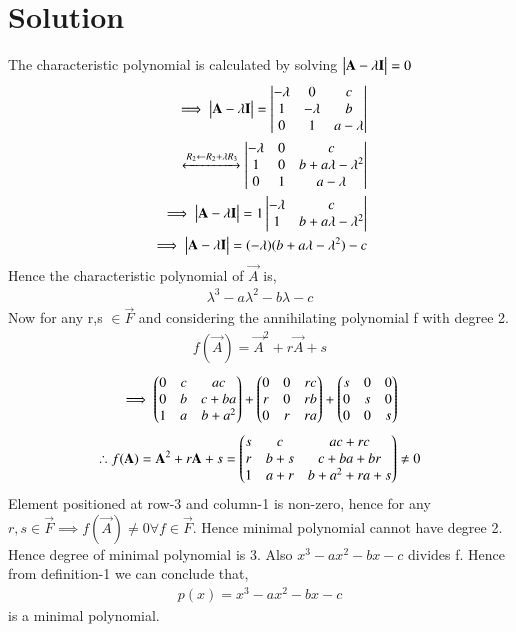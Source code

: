 \documentclass[journal,12pt,twocolumn]{IEEEtran}
\begin{document}
\section{Solution}
The characteristic polynomial is calculated by solving $\begin{vmatrix}\mathbf{A}-\lambda \mathbf{I}\end{vmatrix} = 0$
\begin{align}
\implies \begin{vmatrix}\mathbf{A}-\lambda \mathbf{I}\end{vmatrix} = \begin{vmatrix}-\lambda &0&c\\1&-\lambda &b\\0&1&a-\lambda\end{vmatrix}\\
\xleftrightarrow[]{R_2\leftarrow R_2+\lambda R_3} \begin{vmatrix}-\lambda &0&c\\1&0&b+a\lambda-\lambda^2\\0&1&a-\lambda\end{vmatrix}\\
\implies \begin{vmatrix}\mathbf{A}-\lambda \mathbf{I}\end{vmatrix} = 1\begin{vmatrix}-\lambda & c \\1 & b+a\lambda-\lambda^2\end{vmatrix}\\
\implies \begin{vmatrix}\mathbf{A}-\lambda \mathbf{I}\end{vmatrix} = (-\lambda)( b+a\lambda-\lambda^2) - c
\end{align}
Hence the characteristic polynomial of $\vec{A}$ is,
\begin{align}
\lambda^3-a\lambda^2-b\lambda-c
\label{cp}
\end{align}
Now for any r,s $\in \vec{F}$ and considering the annihilating polynomial f with degree 2.
\begin{align}
f(\vec{A}) = \vec{A}^2+r\vec{A}+s
\end{align}
\begin{align}
\implies \begin{pmatrix}0&c&ac\\0&b&c+ba\\1&a&b+a^2\end{pmatrix} + \begin{pmatrix}0&0&rc\\r&0&rb\\0&r&ra\end{pmatrix}+ \begin{pmatrix}s&0&0\\0&s&0\\0&0&s\end{pmatrix}
\end{align}
\begin{align}
\therefore f(\mathbf{A}) = \mathbf{A}^2+r\mathbf{A}+s = \begin{pmatrix}s&c&ac+rc\\r&b+s&c+ba+br\\1&a+r&b+a^2+ra+s\end{pmatrix} \neq 0
\label{fa}
\end{align}
Element positioned at row-3 and column-1 is non-zero, hence for any $r,s \in \vec{F} \implies f(\vec{A})\neq 0  \forall f \in \vec{F}$. Hence minimal polynomial cannot have degree 2. Hence degree of minimal polynomial is 3. Also $x^3-ax^2-bx-c$ divides f. Hence from definition-1 we can conclude that,
\begin{align}
p(x) = x^3-ax^2-bx-c
\end{align} 
is a minimal polynomial.
\end{document}

